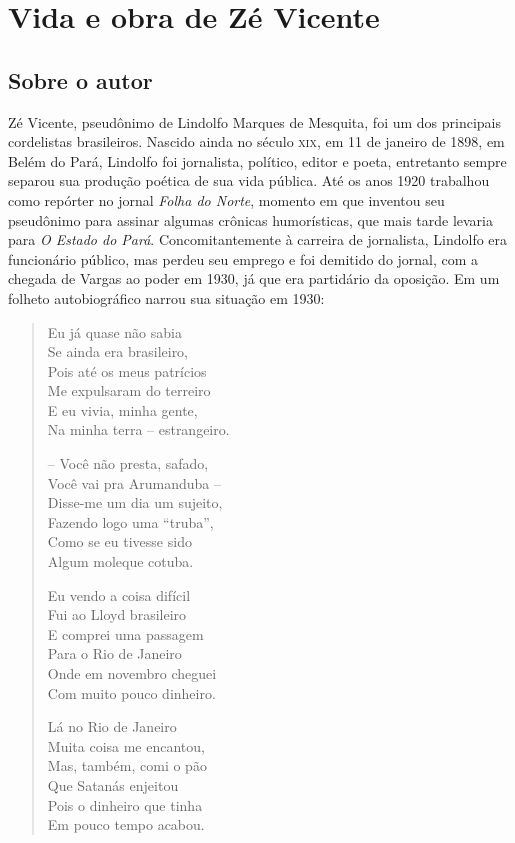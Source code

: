 \chapter{Vida e obra de Zé Vicente}

\section{Sobre o autor}

Zé Vicente, pseudônimo de Lindolfo Marques de Mesquita, foi um dos
principais cordelistas brasileiros. Nascido ainda no século \textsc{xix}, em 11 de
janeiro de 1898, em Belém do Pará, Lindolfo foi jornalista, político,
editor e poeta, entretanto sempre separou sua produção poética de sua
vida pública. Até os anos 1920 trabalhou como repórter no jornal \textit{Folha
do Norte}, momento em que inventou seu pseudônimo para assinar algumas
crônicas humorísticas, que mais tarde levaria para \textit{O Estado do Pará}.
Concomitantemente à carreira de jornalista, Lindolfo era funcionário
público, mas perdeu seu emprego e foi demitido do jornal, com a chegada
de Vargas ao poder em 1930, já que era partidário da oposição.
Em um folheto autobiográfico narrou sua situação em 1930:

\begin{verse}
Eu já quase não sabia\\
Se ainda era brasileiro,\\
Pois até os meus patrícios\\
Me expulsaram do terreiro\\
E eu vivia, minha gente, \\
Na minha terra -- estrangeiro.

-- Você não presta, safado, \\
Você vai pra Arumanduba --\\
Disse-me um dia um sujeito,\\
Fazendo logo uma “truba”,\\
Como se eu tivesse sido\\
Algum moleque cotuba.

Eu vendo a coisa difícil\\
Fui ao Lloyd brasileiro\\
E comprei uma passagem\\
Para o Rio de Janeiro\\
Onde em novembro cheguei\\
Com muito pouco dinheiro.

Lá no Rio de Janeiro\\
Muita coisa me encantou,\\
Mas, também, comi o pão\\
Que Satanás enjeitou\\
Pois o dinheiro que tinha\\
Em pouco tempo acabou.
\end{verse}

